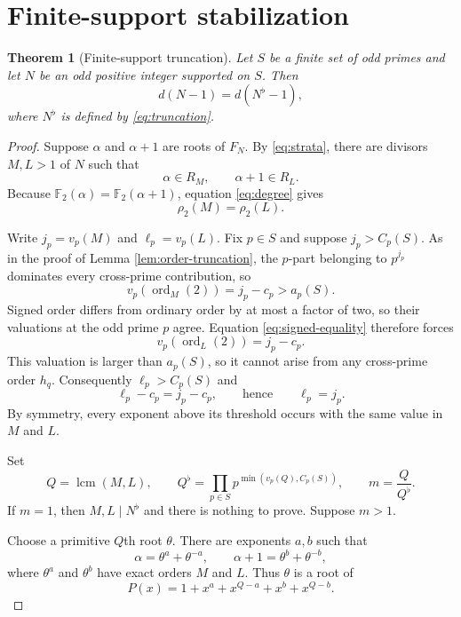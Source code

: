 \documentclass[a4paper]{article}
\newtheorem{theorem}{Theorem}[section]
\newcommand{\F}{\mathbb{F}}
\newcommand{\ord}[2][]{\operatorname{ord}_{#1}\!\left(#2\right)}
\begin{document}
\section{Finite-support stabilization}

\begin{theorem}[Finite-support truncation]\label{thm:truncation}
	Let $S$ be a finite set of odd primes and let $N$ be an odd positive integer supported on $S$.
	Then
	\[
		d(N-1)=d(N^\flat-1),
	\]
	where $N^\flat$ is defined by \eqref{eq:truncation}.
\end{theorem}

\begin{proof}
	Suppose $\alpha$ and $\alpha+1$ are roots of $F_N$.
	By \eqref{eq:strata}, there are divisors $M,L>1$ of $N$ such that
	\[
		\alpha\in R_M,
		\qquad
		\alpha+1\in R_L.
	\]
	Because $\F_2(\alpha)=\F_2(\alpha+1)$, equation \eqref{eq:degree} gives
	\begin{equation}\label{eq:signed-equality}
		\rho_2(M)=\rho_2(L).
	\end{equation}

	Write $j_p=v_p(M)$ and $\ell_p=v_p(L)$.
	Fix $p\in S$ and suppose $j_p>C_p(S)$.
	As in the proof of Lemma \ref{lem:order-truncation}, the $p$-part belonging to $p^{j_p}$ dominates every cross-prime contribution, so
	\[
		v_p\!\left(\ord[M]{2}\right)=j_p-c_p>a_p(S).
	\]
	Signed order differs from ordinary order by at most a factor of two, so their valuations at the odd prime $p$ agree.
	Equation \eqref{eq:signed-equality} therefore forces
	\[
		v_p\!\left(\ord[L]{2}\right)=j_p-c_p.
	\]
	This valuation is larger than $a_p(S)$, so it cannot arise from any cross-prime order $h_q$.
	Consequently $\ell_p>C_p(S)$ and
	\[
		\ell_p-c_p=j_p-c_p,
		\qquad\text{hence}\qquad
		\ell_p=j_p.
	\]
	By symmetry, every exponent above its threshold occurs with the same value in $M$ and $L$.

	Set
	\[
		Q=\operatorname{lcm}(M,L),
		\qquad
		Q^\flat=\prod_{p\in S}p^{\min(v_p(Q),C_p(S))},
		\qquad
		m=\frac{Q}{Q^\flat}.
	\]
	If $m=1$, then $M,L\mid N^\flat$ and there is nothing to prove.
	Suppose $m>1$.

	Choose a primitive $Q$th root $\theta$.
	There are exponents $a,b$ such that
	\[
		\alpha=\theta^a+\theta^{-a},
		\qquad
		\alpha+1=\theta^b+\theta^{-b},
	\]
	where $\theta^a$ and $\theta^b$ have exact orders $M$ and $L$.
	Thus $\theta$ is a root of
	\begin{equation}\label{eq:sparse}
		P(x)=1+x^a+x^{Q-a}+x^b+x^{Q-b}.
	\end{equation}


\end{proof}
\end{document}
